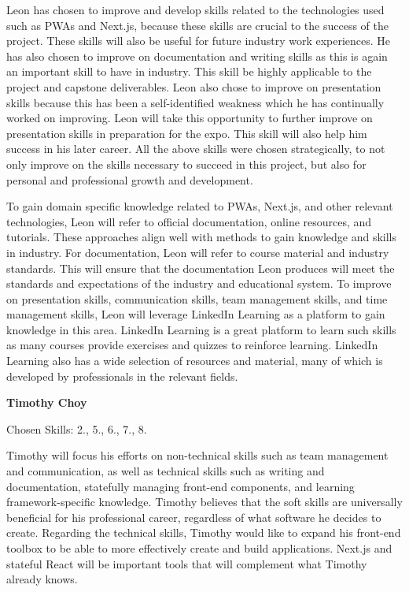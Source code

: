 \documentclass[12pt]{article}
\begin{document}
\begin{enumerate}
	      Leon has chosen to improve and develop skills related to the technologies used such as PWAs and
	      Next.js, because these skills are crucial to the success of the project. These skills will also be
	      useful for future industry work experiences. He has also chosen to improve on documentation and
	      writing skills as this is again an important skill to have in industry. This skill be highly
	      applicable to the project and capstone deliverables. Leon also chose to improve on presentation
	      skills because this has been a self-identified weakness which he has continually worked on
	      improving. Leon will take this opportunity to further improve on presentation skills in preparation
	      for the expo. This skill will also help him success in his later career. All the above skills were
	      chosen strategically, to not only improve on the skills necessary to succeed in this project, but
	      also for personal and professional growth and development.

	      To gain domain specific knowledge related to PWAs, Next.js, and other relevant technologies, Leon
	      will refer to official documentation, online resources, and tutorials. These approaches align well
	      with methods to gain knowledge and skills in industry. For documentation, Leon will refer to course
	      material and industry standards. This will ensure that the documentation Leon produces will meet
	      the standards and expectations of the industry and educational system. To improve on presentation
	      skills, communication skills, team management skills, and time management skills, Leon will
	      leverage LinkedIn Learning as a platform to gain knowledge in this area. LinkedIn Learning is a
	      great platform to learn such skills as many courses provide exercises and quizzes to reinforce
	      learning. LinkedIn Learning also has a wide selection of resources and material, many of which is
	      developed by professionals in the relevant fields.

	      \textbf{Timothy Choy}

	      Chosen Skills: 2., 5., 6., 7., 8.

	      Timothy will focus his efforts on non-technical skills such as team management and communication,
	      as well as technical skills such as writing and documentation, statefully managing front-end
	      components, and learning framework-specific knowledge. Timothy believes that the soft skills are
	      universally beneficial for his professional career, regardless of what software he decides to
	      create. Regarding the technical skills, Timothy would like to expand his front-end toolbox to be
	      able to more effectively create and build applications. Next.js and stateful React will be
	      important tools that will complement what Timothy already knows.


\end{enumerate}
\end{document}
